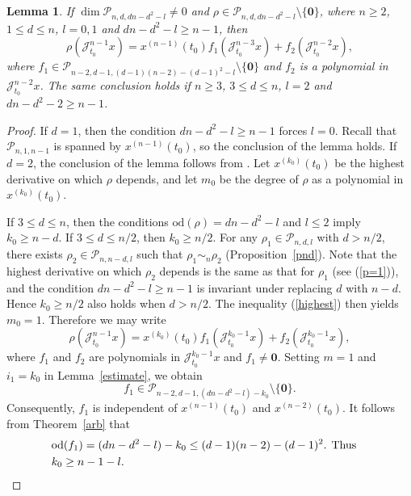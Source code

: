 \documentclass[11pt]{amsart}
\numberwithin{equation}{section}
\newtheorem{lemma}[thm]{Lemma}
\newcommand{\sd}{\mathrm{od}}
\newcommand{\scp}{\mathscr{P}}
\newcommand{\sj}{\mathscr{J}}
\newcommand{\sjmx}{\mathscr{J}^{n-1}_{t_0} x}
\newcommand{\zero}{\mathbf{0}}
\begin{document}
\begin{lemma} \label{n-1}
  If $\dim\scp_{n,d,dn-d^2-l}\neq0$ and $\rho\in\scp_{n,d,dn-d^2-l}\setminus\{\zero\}$, where $n\ge2$, $1\le d\le n$, $l=0,1$ and $dn-d^2-l\ge n-1$, then
\begin{equation}\label{2terms}
    \rho(\sjmx)=x^{(n-1)}(t_0)f_1(\sj_{t_0}^{n-3}x)+f_2(\sj_{t_0}^{n-2}x),
\end{equation}
where $f_1\in\scp_{n-2,d-1,(d-1)(n-2)-(d-1)^2-l}\setminus\{\zero\}$ and $f_2$ is a polynomial in $\sj_{t_0}^{n-2}x$. The same conclusion holds if $n\ge3$, $3\le d\le n$, $l=2$ and $dn-d^2-2\ge n-1$.
\end{lemma}
\begin{proof} If $d=1$, then the condition $dn-d^2-l\ge n-1$ forces $l=0$. Recall that $\scp_{n,1,n-1}$ is spanned by $x^{(n-1)}(t_0)$, so the conclusion of the lemma holds. If $d=2$, the conclusion of the lemma follows from \cite[Theorem 1.1]{wz}. Let $x^{(k_0)}(t_0)$ be the highest derivative on which $\rho$ depends, and let $m_0$ be the degree of $\rho$ as a polynomial in $x^{(k_0)}(t_0)$.

If $3\le d\le n$, then the conditions $\sd(\rho)=dn-d^2-l$ and $l\le2$ imply $k_0\ge n-d$. If $3\le d\le n/2$, then $k_0\ge n/2$. For any $\rho_1\in\scp_{n,d,l}$ with $d>n/2$, there exists $\rho_2\in\scp_{n,n-d,l}$ such that $\rho_1\sim_n\rho_2$ (Proposition~\ref{pnd}). Note that the highest derivative on which $\rho_2$ depends is the same as that for $\rho_1$ (see (\ref{p=1})), and the condition $dn-d^2-l\ge n-1$ is invariant under replacing $d$ with $n-d$. Hence $k_0\ge n/2$ also holds when $d>n/2$. The inequality (\ref{highest}) then yields $m_0=1$.
Therefore we may write
\begin{equation}\label{rhot}
    \rho(\sjmx)=x^{(k_0)}(t_0)f_1(\sj_{t_0}^{k_0-1}x)+f_2(\sj_{t_0}^{k_0-1}x),
\end{equation}
where $f_1$ and $f_2$ are polynomials in $\sj_{t_0}^{k_0-1}x$ and $f_1\neq\zero$. Setting $m=1$ and $i_1=k_0$ in Lemma~\ref{estimate}, we obtain
\begin{equation}\label{tf1}
    f_1\in\scp_{n-2,d-1,(dn-d^2-l)-k_0}\setminus\{\zero\}.
\end{equation}
Consequently, $f_1$ is independent of $x^{(n-1)}(t_0)$ and $x^{(n-2)}(t_0)$. It follows from Theorem~\ref{arb} that
\begin{eqnarray}
    & \sd(f_1)=(dn-d^2-l)-k_0\le(d-1)(n-2)-(d-1)^2. \hspace{1.5mm} \text{Thus} & \notag \\
    & k_0\ge n-1-l.  & \label{k0}
\end{eqnarray}


\end{proof}
\end{document}
